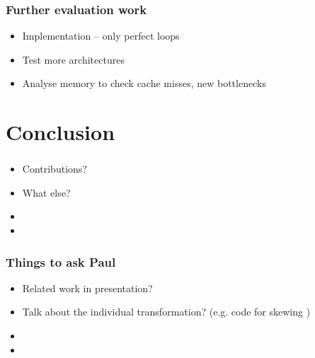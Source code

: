\documentclass{beamer}
\begin{document}
\begin{frame}
\frametitle{Further evaluation work}

\begin{itemize}
	\item Implementation -- only perfect loops
	\item Test more architectures
	\item Analyse memory to check cache misses, new bottlenecks
\end{itemize}
\end{frame}



\section{Conclusion}

\begin{frame}
\frametitle{}

\begin{itemize}
	\item Contributions?
	\item What else?
	\item 
	\item 
\end{itemize}
\end{frame}



\begin{frame}
\frametitle{Things to ask Paul}

\begin{itemize}
	\item Related work in presentation?
	\item Talk about the individual transformation? (e.g. code for skewing \Sadey)
	\item 
	\item 
\end{itemize}
\end{frame}



%
\end{document}
